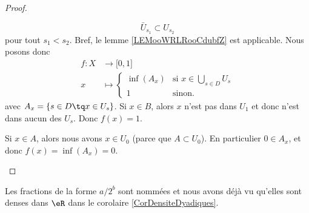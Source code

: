 \begin{proof}
\begin{subproof}
		\begin{equation}
			\bar U_{s_1}\subset U_{s_2}
		\end{equation}
		pour tout \( s_1<s_2\). Bref, le lemme \ref{LEMooWRLRooCdubfZ} est applicable. Nous posons donc
		\begin{equation}
			\begin{aligned}
				f\colon X & \to \mathopen[ 0 , 1 \mathclose]                        \\
				x         & \mapsto \begin{cases}
					                    \inf(A_x) & \text{si } x\in \bigcup_{s\in D}U_s \\
					                    1         & \text{sinon. }
				                    \end{cases}
			\end{aligned}
		\end{equation}
		avec \( A_x=\{ s\in D\tq x\in U_s \}\).
		Si \( x\in B\), alors \( x\) n'est pas dans \( U_1\) et donc n'est dans aucun des \( U_s\). Donc \( f(x)=1\).

		Si \( x\in A\), alors nous avons \( x\in U_0\) (parce que \( A\subset U_0\)). En particulier \( 0\in A_x\), et donc \( f(x)= \inf(A_x)=0\).
	\end{subproof}
\end{proof}

\begin{normaltext}
	Les fractions de la forme \( a/2^b\) sont nommées  et nous avons déjà vu qu'elles sont denses dans \( \eR\) dans le corolaire \ref{CorDensiteDyadiques}.
\end{normaltext}
